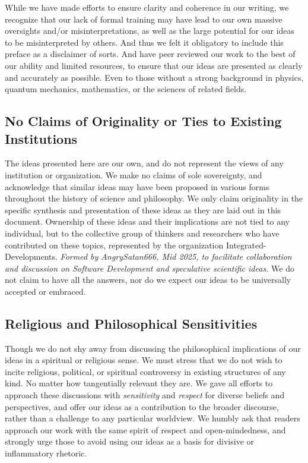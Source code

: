 \documentclass[11pt]{article}
\begin{document}
        While we have made efforts to ensure clarity and coherence in our writing, we recognize that our lack of formal training may have lead to our own massive oversights and/or misinterpretations,
        as well as the large potential for our ideas to be misinterpreted by others. And thus we felt it obligatory to include this preface as a disclaimer of sorts.
        And have peer reviewed our work to the best of our ability and limited resources, to ensure that our ideas are presented as clearly and accurately as possible.
        Even to those without a strong background in physics, quantum mechanics, mathematics, or the sciences of related fields.

    \subsection{No Claims of Originality or Ties to Existing Institutions}
        \hspace{1em}
        The ideas presented here are our own, and do not represent the views of any institution or organization.
        We make no claims of sole sovereignty, and acknowledge that similar ideas may have been proposed in various forms throughout the history of science and philosophy.
        We only claim originality in the specific synthesis and presentation of these ideas as they are laid out in this document.
        Ownership of these ideas and their implications are not tied to any individual, but to the collective group of thinkers and researchers who have contributed on these topics, represented by the organization Integrated-Developments.
        \emph{Formed by AngrySatan666, Mid 2025, to facilitate collaboration and discussion on Software Development and speculative scientific ideas.}
        We do not claim to have all the answers, nor do we expect our ideas to be universally accepted or embraced.
    \subsection{Religious and Philosophical Sensitivities}
        \hspace{1em}
        Though we do not shy away from discussing the philosophical implications of our ideas in a spiritual or religious sense.
        We must stress that we do not wish to incite religious, political, or spiritual controversy in existing structures of any kind.
        No matter how tangentially relevant they are.
        We gave all efforts to approach these discussions with \emph{sensitivity} and \emph{respect} for diverse beliefs and perspectives, and offer our ideas as a contribution to the broader discourse, rather than a challenge to any particular worldview.
        We humbly ask that readers approach our work with the same spirit of respect and open-mindedness, and strongly urge those to avoid using our ideas as a basis for divisive or inflammatory rhetoric.
\end{document}
